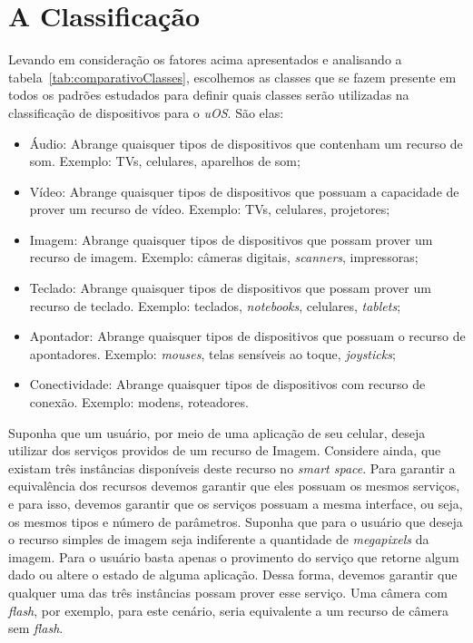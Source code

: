 \section{A Classificação}
Levando em consideração os fatores acima apresentados e analisando a tabela~\ref{tab:comparativoClasses}, escolhemos as classes que se fazem presente em todos os padrões estudados para definir quais classes serão utilizadas na classificação de dispositivos para o \emph{uOS}. São elas:

\begin{itemize}
	\item Áudio:
		Abrange quaisquer tipos de dispositivos que contenham um recurso de som. Exemplo: TVs, celulares, aparelhos de som;
	\item Vídeo:
		Abrange quaisquer tipos de dispositivos que possuam a capacidade de prover um recurso de vídeo. Exemplo: TVs, celulares, projetores;
	\item Imagem:
		Abrange quaisquer tipos de dispositivos que possam prover um recurso de imagem. Exemplo: câmeras digitais, \emph{scanners}, impressoras;
	\item Teclado:
		Abrange quaisquer tipos de dispositivos que possam prover um recurso de teclado. Exemplo: teclados, \emph{notebooks}, celulares, \emph{tablets};
	\item Apontador:
		Abrange quaisquer tipos de dispositivos que possuam o recurso de apontadores. Exemplo: \emph{mouses}, telas sensíveis ao toque, \emph{joysticks};
	\item Conectividade:
		Abrange quaisquer tipos de dispositivos com recurso de conexão. Exemplo: modens, roteadores.
\end{itemize}

Suponha que um usuário, por meio de uma aplicação de seu celular, deseja utilizar dos serviços providos de um recurso de Imagem. Considere ainda, que existam três instâncias disponíveis deste recurso no \emph{smart space}. Para garantir a equivalência dos recursos devemos garantir que eles possuam os mesmos serviços, e para isso, devemos garantir que os serviços possuam a mesma interface, ou seja, os mesmos tipos e número de parâmetros. Suponha que para o usuário que deseja o recurso simples de imagem seja indiferente a quantidade de \emph{megapixels} da imagem. Para o usuário basta apenas o provimento do serviço que retorne algum dado ou altere o estado de alguma aplicação. Dessa forma, devemos garantir que qualquer uma das três instâncias possam prover esse serviço. Uma câmera com \emph{flash}, por exemplo, para este cenário, seria equivalente a um recurso de câmera sem \emph{flash}.



